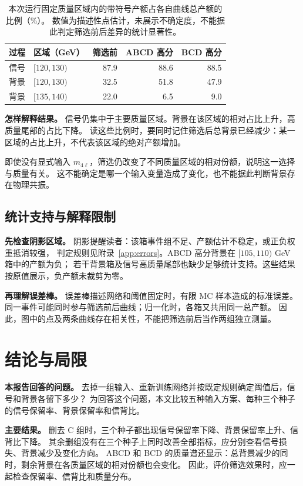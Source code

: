 \documentclass[11pt,a4paper,fontset=fandol,scheme=plain]{ctexart}
\begin{document}
\begin{table}[H]
\caption{本次运行固定质量区域内的带符号产额占各自曲线总产额的比例（\%）。
数值为描述性点估计，未展示不确定度，不能据此判定筛选前后差异的统计显著性。}
\label{tab:fractions}
\centering
\small
\begin{tabular}{llrrr}
\toprule
过程 & 区域（GeV） & 筛选前 & ABCD 高分 & BCD 高分 \\
\midrule
信号 & $[120,130)$ & 87.9 & 88.6 & 88.5 \\
背景 & $[120,130)$ & 32.5 & 51.8 & 47.9 \\
背景 & $[135,140)$ & 22.0 & 6.5 & 9.0 \\
\bottomrule
\end{tabular}
\end{table}

\textbf{怎样解释结果。} 信号仍集中于主要质量区域。背景在该区域的相对占比上升，高质量尾部的占比下降。
读这些比例时，要同时记住筛选后总背景已经减少：某一区域的占比上升，不代表该区域的绝对产额增加。

即使没有显式输入 $m_{4\ell}$，筛选仍改变了不同质量区域的相对份额，说明这一选择与质量有关。
这不能确定是哪一个输入变量造成了变化，也不能据此判断背景存在物理共振。
\FloatBarrier

\subsection{统计支持与解释限制}
\textbf{先检查阴影区域。} 阴影提醒读者：该箱事件组不足、产额估计不稳定，或正负权重抵消较强，
判定规则见附录~\ref{app:errors}。ABCD 高分背景在 $[105,110)$ GeV 箱中的产额为负；
若干背景箱及信号高质量尾部也缺少足够统计支持。这些结果按原值展示，负产额未裁剪为零。

\textbf{再理解误差棒。} 误差棒描述网络和阈值固定时，有限 MC 样本造成的标准误差。
同一事件可能同时参与筛选前后曲线；归一化时，各箱又共用同一总产额。
因此，图中的点及两条曲线存在相关性，不能把筛选前后当作两组独立测量。

\section{结论与局限}\label{sec:conclusion}

\textbf{本报告回答的问题。} 去掉一组输入、重新训练网络并按既定规则确定阈值后，信号和背景各留下多少？
为回答这个问题，本文比较五种输入方案、每种三个种子的信号保留率、背景保留率和信背比。

\textbf{主要结果。} 删去 C 组时，三个种子都出现信号保留率下降、背景保留率上升、信背比下降。
其余删组没有在三个种子上同时改善全部指标，应分别查看信号损失、背景减少及变化方向。
ABCD 和 BCD 的质量谱还显示：总背景减少的同时，剩余背景在各质量区域的相对份额也会变化。
因此，评价筛选效果时，应一起检查保留率、信背比和质量分布。
\end{document}
